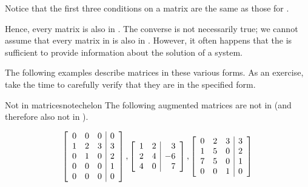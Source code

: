 Notice that the first three conditions on a \rref  \; matrix are the same as those for \ef. 



Hence, every \rref \;matrix is also in \ef. The converse is not necessarily true;
 we cannot assume that every matrix in \ef \;is also in \rref. However, it often happens
that the \ef \;is sufficient to provide information about the solution of a system.

The following examples describe matrices in these various forms. As an exercise, take the time
to carefully verify that they are in the specified form.

\begin{example}{Not in \EF}{matricesnotechelon}
The following augmented matrices are not in \ef \;(and therefore also not in \rref).

\begin{equation*}
\left[
\begin{array}{rrr|r}
0 & 0 & 0 & 0 \\
1 & 2 & 3 & 3 \\
0 & 1 & 0 & 2 \\
0 & 0 & 0 & 1 \\
0 & 0 & 0 & 0
\end{array}
\right] ,\left[
\begin{array}{rr|r}
1 & 2 & 3 \\
2 & 4 & -6 \\
4 & 0 & 7
\end{array}
\right] ,\left[
\begin{array}{rrr|r}
0 & 2 & 3 & 3 \\
1 & 5 & 0 & 2 \\
7 & 5 & 0 & 1 \\
0 & 0 & 1 & 0
\end{array}
\right] 
\end{equation*}
\end{example}

